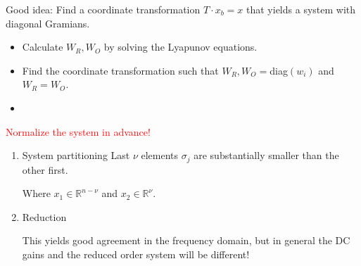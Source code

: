 \documentclass[10pt,a4paper]{scrartcl}
\begin{document}
\begin{multicols*}{3}
\finn

Good idea: Find a coordinate transformation $T\cdot x_b=x$ that yields a system with diagonal Gramians.

\begin{itemize}
\item Calculate $W_R,W_O$ by solving the Lyapunov equations.
\item Find the coordinate transformation such that $W_R,W_O=$diag$(w_i)$ and $W_R=W_O$.
\item {}
\end{itemize}

\textcolor{red}{Normalize the system in advance!}

\begin{enumerate}
\ncompaq
\item System partitioning
Last $\nu$ elements $\sigma_j$ are substantially smaller than the other first.

Where $x_1\in\mathbb{R}^{n-\nu}$ and $x_2\in\mathbb{R}^\nu$.
\item Reduction

This yields good agreement in the frequency domain, but in general the DC gains and the reduced order system will be different!


\end{enumerate}
\end{multicols*}
\end{document}
